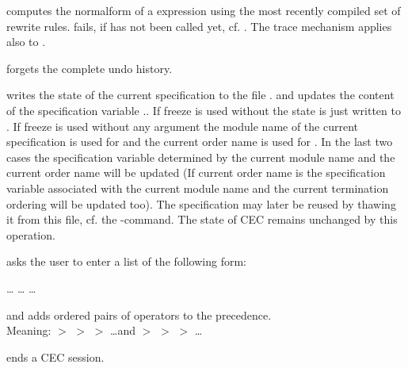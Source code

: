 \begin{command}
computes the normalform of a expression using the most recently compiled set of rewrite
rules.  fails, if  has not been called yet, cf. .
The trace mechanism applies also to .
\end{command}

\begin{command}
forgets the complete undo history.
\end{command}


\begin{command}
writes the state of the current specification to the file
. and
updates the content of the specification variable
..
If freeze is used without  the state is just written
to . 
If freeze is used without any argument the module name of the current 
specification is used for  and the current order name
is used for . In the last two cases the specification 
variable determined by the current module name and the current order name
will be updated (If current order name is  the specification
variable associated with the current module name and the current termination
ordering will be updated too).
The specification may later be reused by thawing it from this file, cf. the 
-command.
The state of CEC remains unchanged by this operation.
\end{command}

 
\begin{command}
asks the user to enter a list of the following form: 
\begin{center}
\kw{[}\kw{[}\kw{,}\kw{,}\kw{,} \ldots \kw{],}
\kw{[}\kw{,}\kw{,}\kw{,} \ldots \kw{],} \ldots \kw{]}
\end{center}
and adds ordered pairs of operators to the precedence.\\
Meaning:  $>$  $>$  $>$ \ldots and 
 $>$  $>$  $>$ \ldots
\end{command}


\begin{command}
ends a CEC session.
\end{command}


